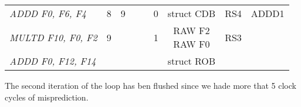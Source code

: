 \begin{enumerate}
\begin{table}[H]
{\begin{tabular}{l|ccccc|ccc}
            \textit{ADDD F0, F6, F4}                  & 8              & 9                  &                &                 & 0            & struct CDB                  & RS4         & ADDD1         \\
            \textit{MULTD F10, F0, F2}                & 9              &                    &                &                 & 1            & \makecell{RAW F2 \\ RAW F0} & RS3         &               \\
            \textit{ADDD F0, F12, F14}                &                &                    &                &                 &              & struct ROB                  &             &              
            \end{tabular}%
            }
        \end{table}
        The second iteration of the loop has ben flushed since we hade more that 5 clock cycles of misprediction.
\end{enumerate}